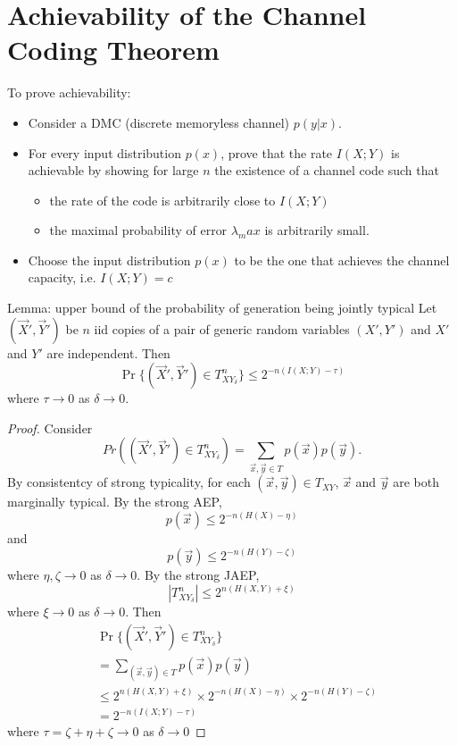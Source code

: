 \documentclass[../main.tex]{subfiles}
\begin{document}
\chapter{Achievability of the Channel Coding Theorem}
To prove achievability:\begin{itemize}
    \item Consider a DMC (discrete memoryless channel)  $p(y|x)$.
    \item For every input distribution $p(x)$, prove that the rate $I(X;Y)$ is achievable by showing for large $n$ the existence of a channel code such that \begin{itemize}
        \item the rate of the code is arbitrarily close to $I(X;Y)$
        \item the maximal probability of error $\lambda_max$ is arbitrarily small.
    \end{itemize}
    \item Choose the input distribution $p(x)$ to be the one that achieves the channel capacity, i.e. $I(X;Y)=c$
\end{itemize}
\begin{bbox}{Lemma: upper bound of the probability of generation being jointly typical}
    Let $(\vec X', \vec Y')$ be $n$ iid copies of a pair of generic random variables $(X', Y')$ and $X'$ and $Y'$ are independent. Then \[
    \Pr\{(\vec X',\vec Y')\in T^n_{XY_\delta}\} \leq 2^{-n(I(X;Y)-\tau)}
    \] where $\tau\to 0$ as $\delta \to 0.$
    \begin{proof}
        Consider \[
        Pr((\vec X', \vec Y')\in T^n_{XY_\delta} )= \sum_{\vec x, \vec y\in T}p(\vec x) p(\vec y).
        \]
    By consistentcy of strong typicality, for each $(\vec x, \vec y) \in T_{XY}$, $\vec x$ and $\vec y$ are both marginally typical.
    \newline
    By the strong AEP, 
    \[
    p(\vec x)\leq 2^{-n(H(X)-\eta)}
    \] and \[
    p(\vec y) \leq 2^{-n(H(Y)-\zeta)}
    \]
    where $\eta, \zeta\to 0$ as $\delta \to 0$.
    \newline
    By the strong JAEP, \[
    |T^n_{XY_\delta}|\leq 2^{n(H(X,Y)+\xi)}
    \] where $\xi\to 0$ as $\delta \to 0$.
Then \begin{align*}
    &\Pr\{(\vec X', \vec Y')\in T^n_{XY_\delta}\}\\
    &=\sum_{(\vec x, \vec y)\in T}p(\vec x)p(\vec y)\\
    &\leq 2^{n(H(X,Y)+\xi)}\times 2^{-n(H(X)-\eta)}\times 2^{-n(H(Y)-\zeta)}\\
    &=2^{-n(I(X;Y)-\tau)}
\end{align*}
where $\tau = \zeta + \eta + \zeta\to 0$ as $\delta \to 0$
    \end{proof}
\end{bbox}
\end{document}
